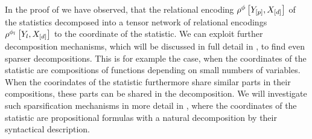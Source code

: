 In the proof of  we have observed, that the relational encoding $\rho^{\phi}\left[Y_{[p]},X_{[d]}\right]$ of the statistics decomposed into a tensor network of relational encodings $\rho^{\phi_{l}}\left[Y_{l},X_{[d]}\right]$ to the coordinate of the statistic.
We can exploit further decomposition mechanisms, which will be discussed in full detail in , to find even sparser decompositions.
This is for example the case, when the coordinates of the statistic are compositions of functions depending on small numbers of variables.
When the coorindates of the statistic furthermore share similar parts in their compositions, these parts can be shared in the decomposition.
We will investigate such sparsification mechanisms in more detail in , where the coordinates of the statistic are propositional formulas with a natural decomposition by their syntactical description.


